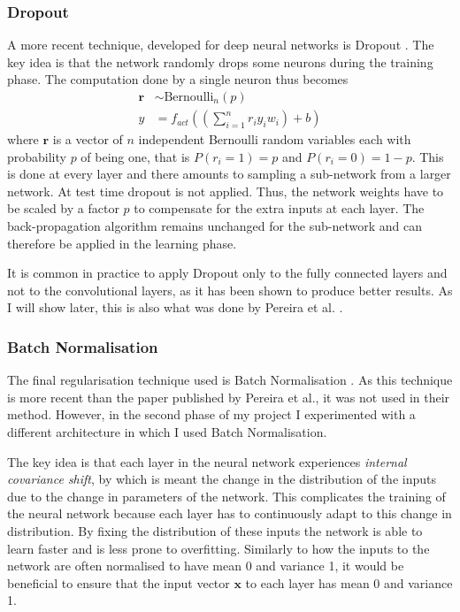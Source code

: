 \documentclass[12pt,a4paper,twoside,openright]{report}
\begin{document}
\subsubsection{Dropout}
A more recent technique, developed for deep neural networks is Dropout \cite{dropout}. The key idea is that the network randomly drops some neurons during the training phase. The computation done by a single neuron thus becomes
\begin{equation}
\begin{split}
	\textbf{r} & \sim \text{Bernoulli}_n(p) \\
	y & = f_{act}((\sum_{i=1}^{n} r_i y_i w_i) + b)
\end{split}
\end{equation}
where $\textbf{r}$ is a vector of $n$ independent Bernoulli random variables each with probability $p$ of being one, that is $P(r_i = 1) = p$ and $P(r_i = 0) = 1 - p$. This is done at every layer and there amounts to sampling a sub-network from a larger network. At test time dropout is not applied. Thus, the network weights have to be scaled by a factor $p$ to compensate for the extra inputs at each layer. The back-propagation algorithm remains unchanged for the sub-network and can therefore be applied in the learning phase.

It is common in practice to apply Dropout only to the fully connected layers and not to the convolutional layers, as it has been shown to produce better results. As I will show later, this is also what was done by Pereira et al. \cite{pereira}.

\subsubsection{Batch Normalisation}
The final regularisation technique used is Batch Normalisation \cite{batch_normalization}. As this technique is more recent than the paper published by Pereira et al., it was not used in their method. However, in the second phase of my project I experimented with a different architecture in which I used Batch Normalisation.

The key idea is that each layer in the neural network experiences \textit{internal covariance shift}, by which is meant the change in the distribution of the inputs due to the change in parameters of the network. This complicates the training of the neural network because each layer has to continuously adapt to this change in distribution. By fixing the distribution of these inputs the network is able to learn faster and is less prone to overfitting. Similarly to how the inputs to the network are often normalised to have mean 0 and variance 1, it would be beneficial to ensure that the input vector $\textbf{x}$ to each layer has mean 0 and variance 1. 
\end{document}
